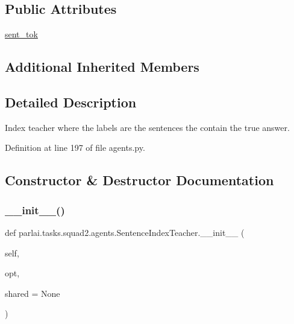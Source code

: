 \subsection*{Public Attributes}
\begin{DoxyCompactItemize}
\item 
\hyperlink{classparlai_1_1tasks_1_1squad2_1_1agents_1_1SentenceIndexTeacher_ac9b01a4a40b5a1a6de68d24e075a22fb}{sent\+\_\+tok}
\end{DoxyCompactItemize}
\subsection*{Additional Inherited Members}


\subsection{Detailed Description}
\begin{DoxyVerb}Index teacher where the labels are the sentences the contain the true answer.
\end{DoxyVerb}
 

Definition at line 197 of file agents.\+py.



\subsection{Constructor \& Destructor Documentation}
\mbox{\label{classparlai_1_1tasks_1_1squad2_1_1agents_1_1SentenceIndexTeacher_ab4c46deb33f625365691be6b36f15a03}} 
\subsubsection{\texorpdfstring{\+\_\+\+\_\+init\+\_\+\+\_\+()}{\_\_init\_\_()}}
{\footnotesize\ttfamily def parlai.\+tasks.\+squad2.\+agents.\+Sentence\+Index\+Teacher.\+\_\+\+\_\+init\+\_\+\+\_\+ (\begin{DoxyParamCaption}\item[{}]{self,  }\item[{}]{opt,  }\item[{}]{shared = {\ttfamily None} }\end{DoxyParamCaption})}



